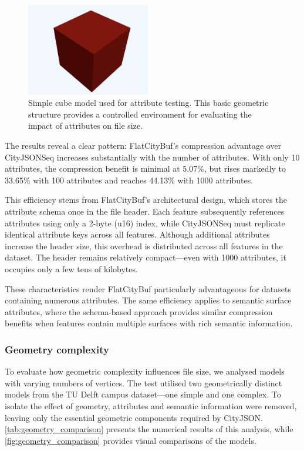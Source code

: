 \begin{figure}[htbp]
  \centering
  \includegraphics[width=0.48\textwidth]{figs/result_analysis/cube.png}
  \caption{Simple cube model used for attribute testing. This basic geometric structure provides a controlled environment for evaluating the impact of attributes on file size.}
  \label{fig:simple_cube}
\end{figure}

The results reveal a clear pattern: FlatCityBuf's compression advantage over CityJSONSeq increases substantially with the number of attributes. With only 10 attributes, the compression benefit is minimal at 5.07\%, but rises markedly to 33.65\% with 100 attributes and reaches 44.13\% with 1000 attributes.

This efficiency stems from FlatCityBuf's architectural design, which stores the attribute schema once in the file header. Each feature subsequently references attributes using only a 2-byte (u16) index, while CityJSONSeq must replicate identical attribute keys across all features. Although additional attributes increase the header size, this overhead is distributed across all features in the dataset. The header remains relatively compact—even with 1000 attributes, it occupies only a few tens of kilobytes.

These characteristics render FlatCityBuf particularly advantageous for datasets containing numerous attributes. The same efficiency applies to semantic surface attributes, where the schema-based approach provides similar compression benefits when features contain multiple surfaces with rich semantic information.

\subsubsection{Geometry complexity}
\label{result:overview:analysis_of_file_size_results:geometric_complexity}

To evaluate how geometric complexity influences file size, we analysed models with varying numbers of vertices. The test utilised two geometrically distinct models from the TU Delft campus dataset—one simple and one complex. To isolate the effect of geometry, attributes and semantic information were removed, leaving only the essential geometric components required by CityJSON. \autoref{tab:geometry_comparison} presents the numerical results of this analysis, while \autoref{fig:geometry_comparison} provides visual comparisons of the models.

